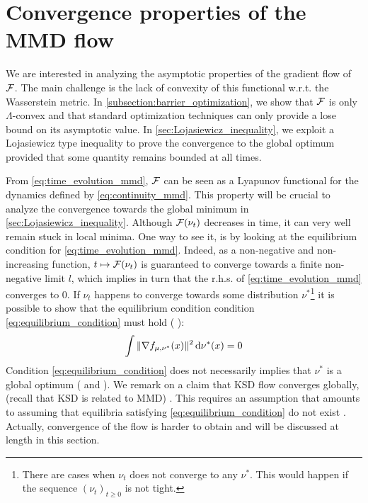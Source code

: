 

\section{Convergence properties of the MMD flow}\label{sec:convergence_mmd_flow}
We are interested in analyzing the asymptotic properties of the gradient flow of ${{\mathcal F}}$. The main challenge is the lack of convexity of this functional w.r.t. the Wasserstein metric. In  \cref{subsection:barrier_optimization}, we show that ${{\mathcal F}}$ is only $\Lambda$-convex and that standard optimization techniques can only provide a lose bound on its asymptotic value.
In \cref{sec:Lojasiewicz_inequality}, we exploit a Lojasiewicz type inequality to prove the convergence to the global optimum provided that some quantity remains bounded at all times. 



From \cref{eq:time_evolution_mmd}, ${{\mathcal F}}$ can be seen as a Lyapunov functional for the dynamics defined by \cref{eq:continuity_mmd}. This property will be crucial to analyze the convergence towards the global minimum in \cref{sec:Lojasiewicz_inequality}.
Although ${{\mathcal F}}(\nu_t)$ decreases in time, it can very well
remain stuck in local minima. One way to see it, is by looking at the equilibrium condition for \cref{eq:time_evolution_mmd}. Indeed, as a non-negative and non-increasing function, $t \mapsto {{\mathcal F}}(\nu_t)$  is guaranteed to converge towards a finite non-negative limit $l$, which implies in turn that the r.h.s. of \cref{eq:time_evolution_mmd} converges to $0$. If $\nu_t$ happens to converge towards some distribution $\nu^{*}$\footnote{There are cases when $\nu_t$ does not converge to any $\nu^*$. This would happen if the sequence $(\nu_t)_{t\geq 0}$ is not tight.} 
it is possible to show that the equilibrium condition condition \cref{eq:equilibrium_condition} must hold (\cite[Proposition 2]{mei2018mean}
):
\begin{align}\label{eq:equilibrium_condition}
\int \Vert \nabla f_{\mu,\nu^{*}}(x)\Vert^2 \mathop{}\!\mathrm{d} \nu^{*}(x) =0  
\end{align}
Condition \cref{eq:equilibrium_condition} does not necessarily implies that $\nu^{*}$ is a global optimum (\cite[Theorem 6]{mei2018mean} and \cite{rotskoff2019global}). 
We remark on a claim that  KSD flow converges globally, (recall that KSD is related to MMD) \cite[Proposition 3, Appendix B.1]{Mroueh:2019}. This  requires an assumption \cite[Assumption A]{Mroueh:2019} that amounts to assuming that equilibria satisfying \cref{eq:equilibrium_condition} do not exist .
Actually, convergence of the flow is harder to obtain and will be discussed at length in this section.





